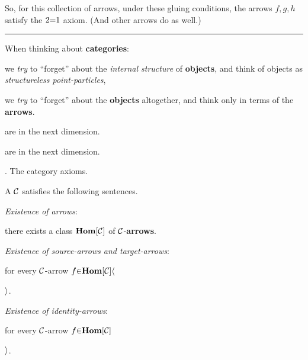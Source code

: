 \vs
So, for this collection of arrows, under these gluing conditions, the arrows $f,g,h$ satisfy the $2 \p= 1$ axiom. (And other arrows do as well.) \par

\vs\hrule\vskip1pt
When thinking about {\bf categories}: \par
  \hs we {\it try} to ``forget'' about the {\it internal structure} of {\bf objects}, and think of objects as {\it structureless point-particles}, \par
  \hs we {\it try} to ``forget'' about the {\bf objects} altogether, and think only in terms of the {\bf arrows}. \par

\vs
{} are  in the next dimension. \par
{} are  in the next dimension.

\vs
{}. The category axioms. \par
A  ${\cal C}$ satisfies the following sentences. \par
   {\it Existence of arrows}: \par
    \hs\hs there exists a class ${\bf Hom}[{\cal C}]$ of ${\cal C}$-{\bf arrows}. \par

   {\it Existence of source-arrows and target-arrows}: \par
    \hs\hs for every ${\cal C}$-arrow $f \p\in {\bf Hom}[{\cal C}] \a\langle$ \par
    \hs\hs $\a\rangle$.

   {\it Existence of identity-arrows}: \par
    \hs\hs for every ${\cal C}$-arrow $f \p\in {\bf Hom}[{\cal C}]$ \par
    \hs\hs $\a\rangle$.

